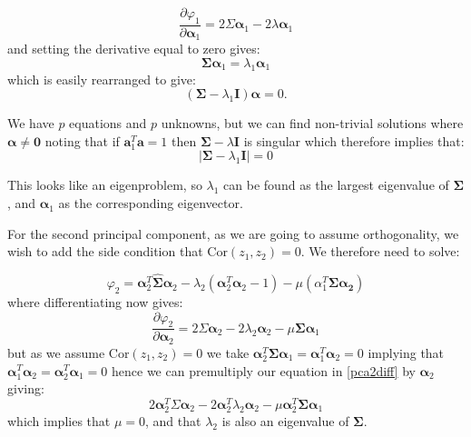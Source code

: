 \begin{equation}
\frac{\partial \varphi_{1}}{\partial \boldsymbol{\alpha}_{1}} = 2 \Sigma \boldsymbol{\alpha}_{1} - 2 \lambda \boldsymbol{\alpha}_{1}
\end{equation}
and setting the derivative equal to zero gives:
\begin{equation}
\boldsymbol{\Sigma} \boldsymbol{\alpha}_{1} = \lambda_{1} \boldsymbol{\alpha}_{1}
\end{equation}
which is easily rearranged to give:
\begin{equation}
(\boldsymbol{\Sigma} - \lambda_{1} \boldsymbol{I})\boldsymbol{\alpha} = 0.
\end{equation}

We have $p$ equations and $p$ unknowns, but we can find non-trivial solutions where $\boldsymbol{\alpha} \neq \boldsymbol{0}$ noting that if  $\boldsymbol{a}_{1}^{T}\boldsymbol{a}= 1$ then $\boldsymbol{\Sigma} - \lambda \boldsymbol{I}$ is singular which therefore implies that:
\begin{equation}
|\boldsymbol{\Sigma} - \lambda_{1} \boldsymbol{I}| = 0
\end{equation}

This looks like an eigenproblem, so $\lambda_{1}$ can be found as the largest eigenvalue of $\boldsymbol{\Sigma}$, and $\boldsymbol{\alpha}_{1}$ as the corresponding eigenvector.

For the second principal component, as we are going to assume orthogonality, we wish to add the side condition that $\mbox{Cor}(z_{1},z_{2}) = 0$.   We therefore need to solve:

\begin{equation}
\varphi_{2} = \boldsymbol{\alpha}_{2}^{T}\boldsymbol{\hat{\Sigma}}\boldsymbol{\alpha}_{2} - \lambda_{2}(\boldsymbol{\alpha}_{2}^{T}\boldsymbol{\alpha}_{2} - 1) - \mu(\alpha_{1}^{T}\boldsymbol{\Sigma}\boldsymbol{\alpha_{2}})
\end{equation}
where differentiating now gives:
\begin{equation}
\label{pca2diff}
\frac{\partial \varphi_{2}}{\partial \boldsymbol{\alpha}_{2}} = 2 \Sigma \boldsymbol{\alpha}_{2} - 2 \lambda_{2} \boldsymbol{\alpha}_{2} - \mu \boldsymbol{\Sigma} \boldsymbol{\alpha}_{1}
\end{equation}
but as we assume $\mbox{Cor}(z_{1},z_{2}) = 0$ we take $\boldsymbol{\alpha}_{2}^{T}\boldsymbol{\Sigma}\boldsymbol{\alpha}_{1} = \boldsymbol{\alpha}_{1}^{T}\boldsymbol{\alpha}_{2} = 0$ implying that $\boldsymbol{\alpha}_{1}^{T}\boldsymbol{\alpha}_{2} = \boldsymbol{\alpha}_{2}^{T}\boldsymbol{\alpha}_{1} = 0$ hence we can premultiply our equation in \ref{pca2diff} by $\boldsymbol{\alpha}_{2}$ giving:
\begin{equation}
\label{pca2diff2}
2 \boldsymbol{\alpha}_{2}^{T} \Sigma \boldsymbol{\alpha}_{2} - 2 \boldsymbol{\alpha}_{2}^{T} \lambda_{2} \boldsymbol{\alpha}_{2} - \mu \boldsymbol{\alpha}_{2}^{T} \boldsymbol{\Sigma} \boldsymbol{\alpha}_{1}
\end{equation}
which implies that $\mu=0$, and that $\lambda_{2}$ is also an eigenvalue of $\boldsymbol{\Sigma}$.

